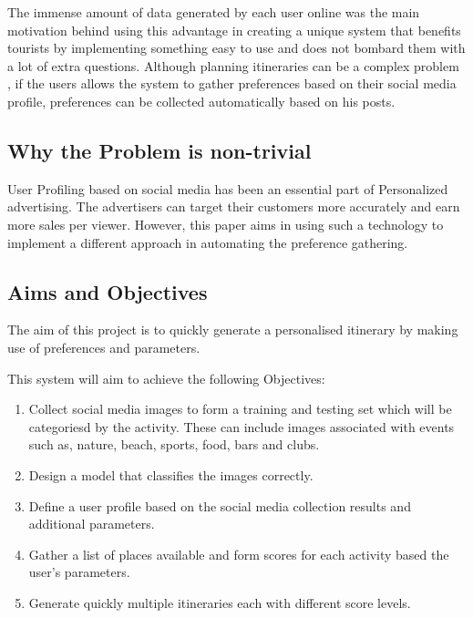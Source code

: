         The immense amount of data generated by each user online
        \cite{J.Clement2020} was the main motivation behind using this
        advantage in creating a unique system that benefits tourists
        by implementing something easy to use and does not bombard
        them with a lot of extra questions. Although planning
        itineraries can be a complex problem \cite{DUNSTALL2008a}, if
        the users allows the system to gather preferences based on
        their social media profile, preferences can be collected
        automatically based on his posts. 

\subsection{Why the Problem is non-trivial}

        User Profiling based on social media has been an essential
        part of Personalized advertising. The advertisers can target
        their customers more accurately and earn more sales per
        viewer\cite{article}. However, this paper aims in using such a
        technology to implement a different approach in automating 
        the preference gathering.

\subsection{Aims and Objectives}
        
        The aim of this project is to quickly generate a personalised
        itinerary by making use of preferences and parameters. 

        This system will aim to achieve the following Objectives:
        \begin{enumerate}
                \item Collect social media images to form a training
                and testing set which will be categoriesd by the
                activity. These can include images associated with
                events such as, nature, beach, sports, food, bars and
                clubs.
                \item Design a model that classifies the images
                correctly.
                \item Define a user profile based on the social media
                collection results and additional parameters.
                \item Gather a list of places available and form
                scores for each activity based the user's parameters.
                \item Generate quickly multiple itineraries each with
                different score levels.
        \end{enumerate}